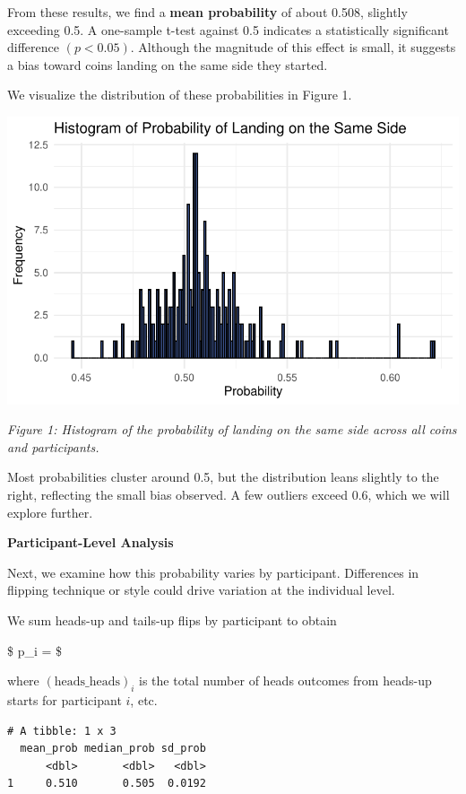 \documentclass[
  letterpaper,
  DIV=11,
  numbers=noendperiod]{scrartcl}
\begin{document}
From these results, we find a \textbf{mean probability} of about 0.508,
slightly exceeding 0.5. A one-sample t-test against 0.5 indicates a
statistically significant difference \((p< 0.05)\). Although the
magnitude of this effect is small, it suggests a bias toward coins
landing on the same side they started.

We visualize the distribution of these probabilities in Figure 1.

\includegraphics{Garcia-Vuksic-RMProject-2024_files/figure-pdf/unnamed-chunk-4-1.pdf}

\emph{Figure 1: Histogram of the probability of landing on the same side
across all coins and participants.}

Most probabilities cluster around 0.5, but the distribution leans
slightly to the right, reflecting the small bias observed. A few
outliers exceed 0.6, which we will explore further.

\textbf{Participant-Level Analysis}

Next, we examine how this probability varies by participant. Differences
in flipping technique or style could drive variation at the individual
level.

We sum heads-up and tails-up flips by participant to obtain

\$ p\_i =
\$

where \((\text{heads_heads})_i\) is the total number of heads outcomes
from heads-up starts for participant \(i\), etc.

\begin{verbatim}
# A tibble: 1 x 3
  mean_prob median_prob sd_prob
      <dbl>       <dbl>   <dbl>
1     0.510       0.505  0.0192
\end{verbatim}
\end{document}
